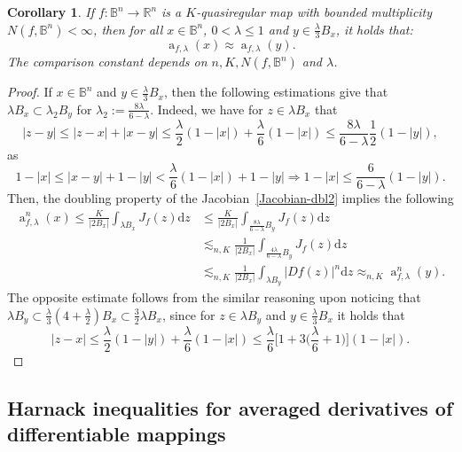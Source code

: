\documentclass[11pt,a4paper,reqno]{amsart}
\newtheorem{cor}[theorem]{Corollary}
\theoremstyle{definition}
\renewcommand{\a}{\operatorname{a}}
\newcommand{\B}{\mathbb{B}^n}
\newcommand{\Rn}{{\mathbb R}^n}
\newcommand{\ud}{\mathrm {d}}
\newcommand{\blue}{\color{blau}}
\newcounter{komcounter}
\numberwithin{komcounter}{section}
\newcommand{\komT}[1]{{\bf \blue [\refstepcounter{komcounter}\thekomcounter (by T): #1]}}
\begin{document}
\begin{cor}\label{est-harnack-N}
If $f:\B\to \Rn$ is a $K$-quasiregular map with bounded multiplicity $N(f,\B)<\infty$, then for all $x\in \B$, $0<\lambda\leq 1$ and $y\in \frac{\lambda}{3} B_x$, it holds that:
\[
   \a_{f, \lambda}(x) \approx \a_{f, \lambda}(y).
\]
The comparison constant depends on $n, K, N(f,\B)$ and $\lambda$. 
\end{cor}

\begin{proof}
 If $x\in \B$ and $y\in \frac{\lambda}{3} B_x$, then the following estimations give that $\lambda B_x\subset \lambda_2 B_y$ for $\lambda_2:=\frac{8\lambda}{6-\lambda}$. Indeed, we have for $z\in \lambda B_x$ that 
 \[
  |z-y|\leq |z-x|+|x-y|\leq \frac{\lambda}{2}(1-|x|)+\frac{\lambda}{6}(1-|x|)\leq \frac{8\lambda}{6-\lambda}\frac12 (1-|y|),
 \]
 as
  $$
   1-|x|\leq |x-y|+1-|y|< \frac{\lambda}{6}(1-|x|)+1-|y|\Rightarrow 1-|x|\leq \frac{6}{6-\lambda }(1-|y|).
  $$
 Then, the doubling property of the Jacobian~\eqref{Jacobian-dbl2} implies the following 
 \begin{align*}
  \a_{f,\lambda}^n(x) \leq \frac{K}{|2B_x|} \int_{\lambda B_x} J_f(z) \ud z & \leq  \frac{K}{|2B_x|} \int_{ \frac{8\lambda}{6-\lambda} B_y} J_f(z) \ud z \\
 &\lesssim_{n, K} \frac{1}{|2B_x|} \int_{\frac{4\lambda}{6-\lambda} B_y} J_f(z) \ud z \\
 &\lesssim_{n, K} \frac{1}{|2B_x|} \int_{\lambda B_y} |Df(z)|^n \ud z \approx_{n, K} \a_{f,\lambda}^n(y).  
 \end{align*}
 The opposite estimate follows from the similar reasoning upon noticing that $\lambda B_y\subset \frac{\lambda}{3}(4+\frac{\lambda}{2}) B_x\subset \frac{3}{2}\lambda B_x$, since for $z\in \lambda B_y$ and $y\in \frac{\lambda}{3} B_x$ it holds that 
 \[
 |z-x| \leq \frac{\lambda}{2}(1-|y|)+\frac{\lambda}{6}(1-|x|)\leq \frac{\lambda}{6}\Big[1+3\Big(\frac{\lambda}{6}+1\Big)\Big](1-|x|).
 \]
\end{proof}

\subsection{Harnack inequalities for averaged derivatives of differentiable mappings}
%
\end{document}
